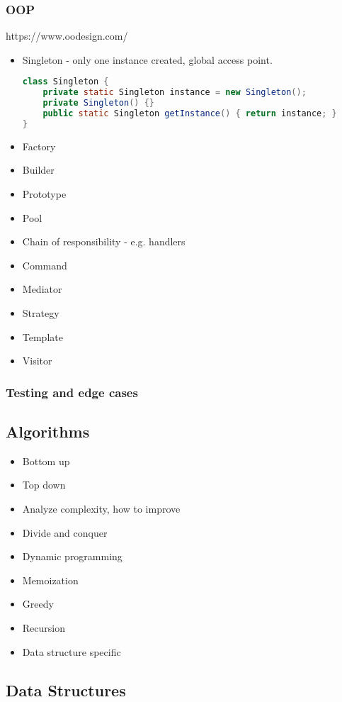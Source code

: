\documentclass{article}
\begin{document}
\subsubsection{OOP}
https://www.oodesign.com/
\begin{itemize}
    \item Singleton - only one instance created, global access point.
\begin{lstlisting}[language=java]
class Singleton {
    private static Singleton instance = new Singleton();
    private Singleton() {}
    public static Singleton getInstance() { return instance; }
}
\end{lstlisting}
    \item Factory
    \item Builder
    \item Prototype
    \item Pool
    \item Chain of responsibility - e.g. handlers
    \item Command
    \item Mediator
    \item Strategy
    \item Template
    \item Visitor
\end{itemize}


\subsubsection{Testing and edge cases}

\subsection{Algorithms}
\begin{itemize}
    \item Bottom up
    \item Top down
    \item Analyze complexity, how to improve
    \item Divide and conquer
    \item Dynamic programming
    \item Memoization
    \item Greedy
    \item Recursion
    \item Data structure specific
\end{itemize}

\subsection{Data Structures}
\end{document}
